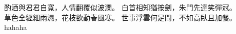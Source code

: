 \documentclass[12pt, a4paper, twocolumn]{article}
\begin{document}
\begin{CJK}{Bg5}{bsmi} %
酌酒與君君自寬，人情翻覆似波瀾。 白首相知猶按劍，朱門先達笑彈冠。 \\
草色全經細雨濕，花枝欲動春風寒。 世事浮雲何足問，不如高臥且加餐。 \\
hahaha
\end{CJK}
\end{document}
